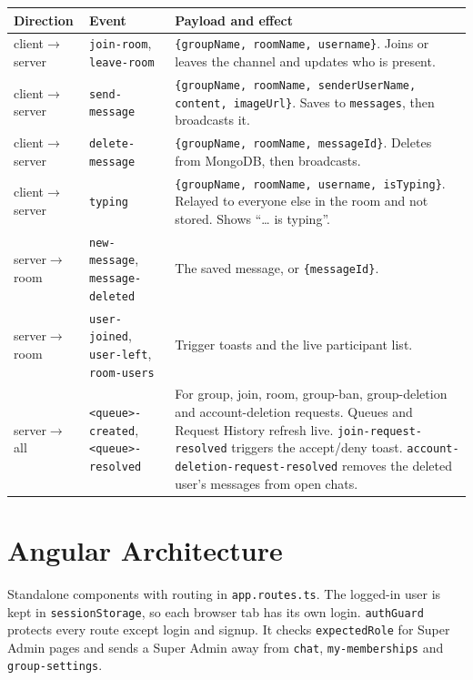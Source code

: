 \documentclass[10pt,a4paper]{article}
\newcommand{\ep}[1]{\texttt{\small #1}}
\begin{document}
\small
\begin{longtable}{L{2.2cm} L{4.0cm} L{9.5cm}}
\toprule
\textbf{Direction} & \textbf{Event} & \textbf{Payload and effect}\\
\midrule
\endhead
client$\to$server & \ep{join-room}, \ep{leave-room} & \ep{\{groupName, roomName, username\}}. Joins or leaves the channel and updates who is present.\\
client$\to$server & \ep{send-message} & \ep{\{groupName, roomName, senderUserName, content, imageUrl\}}. Saves to \ep{messages}, then broadcasts it.\\
client$\to$server & \ep{delete-message} & \ep{\{groupName, roomName, messageId\}}. Deletes from MongoDB, then broadcasts.\\
client$\to$server & \ep{typing} & \ep{\{groupName, roomName, username, isTyping\}}. Relayed to everyone else in the room and not stored. Shows ``\ldots{} is typing''.\\
server$\to$room & \ep{new-message}, \ep{message-deleted} & The saved message, or \ep{\{messageId\}}.\\
server$\to$room & \ep{user-joined}, \ep{user-left}, \ep{room-users} & Trigger toasts and the live participant list.\\
server$\to$all & \ep{<queue>-created}, \ep{<queue>-resolved} & For group, join, room, group-ban, group-deletion and account-deletion requests. Queues and Request History refresh live. \ep{join-request-resolved} triggers the accept/deny toast. \ep{account-deletion-request-resolved} removes the deleted user's messages from open chats.\\
\bottomrule
\end{longtable}
\normalsize

\section{Angular Architecture}
Standalone components with routing in \ep{app.routes.ts}. The logged-in user is kept in \ep{sessionStorage}, so each browser tab has its own login. \ep{authGuard} protects every route except login and signup. It checks \ep{expectedRole} for Super Admin pages and sends a Super Admin away from \ep{chat}, \ep{my-memberships} and \ep{group-settings}.
\end{document}

